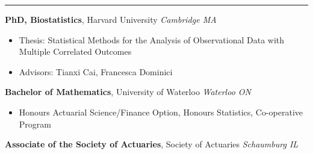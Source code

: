 \documentclass[10pt,english]{report}
\begin{document}
\vspace{5mm}

{}
\vspace{1mm}\hrule
\vspace{2mm}


\textbf{PhD, Biostatistics}, Harvard University \hfill \textit{Cambridge MA} \texttt{}
\begin{itemize}
\item Thesis: Statistical Methods for the Analysis of Observational Data with Multiple Correlated Outcomes
\item Advisors: Tianxi Cai, Francesca Dominici
\end{itemize}

\vspace{1mm}

\textbf{Bachelor of Mathematics}, University of Waterloo \hfill \textit{Waterloo ON} \texttt{}
\begin{itemize}
\item Honours Actuarial Science/Finance Option, Honours Statistics, Co-operative
Program
\end{itemize}

\vspace{1mm}

\textbf{Associate of the Society of Actuaries}, Society of Actuaries \hfill \textit{Schaumburg IL} \texttt{}
\end{document}
